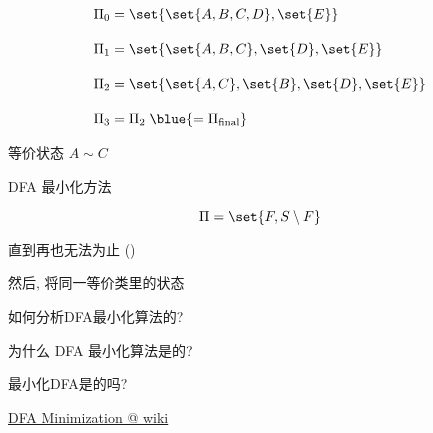\begin{frame}{}
  \begin{align*}
    \Pi_{0} &= \set{\set{A, B, C, D}, \set{E}} \\[10pt]
    \Pi_{1} &= \set{\set{A, B, C}, \set{D}, \set{E}} \\[10pt]
    \Pi_{2} &= \set{\set{A, C}, \set{B}, \set{D}, \set{E}} \\[10pt]
    \Pi_{3} &= \Pi_{2} \;\blue{= \Pi_{\text{final}}}
  \end{align*}
\end{frame}

\begin{frame}{}

  \begin{center}
    等价状态 $A \sim C$
  \end{center}


  \pause
  \begin{center}
     
  \end{center}
\end{frame}

\begin{frame}{}
  \begin{center}
    DFA 最小化方法
  \end{center}

  \[
    \Pi = \set{F, S \setminus F}
  \]


  \begin{center}
    直到再也无法为止 \quad ()

    \vspace{0.40cm}
    然后, 将同一等价类里的状态
  \end{center}
\end{frame}

\begin{frame}{}
  \begin{center}
    如何分析DFA最小化算法的?

    \pause
    \vspace{0.60cm}
    为什么 DFA 最小化算法是的?

    \pause
    \vspace{0.60cm}
    最小化DFA是的吗?

    \pause
    \vspace{0.80cm}
	\href{https://en.wikipedia.org/wiki/DFA_minimization}{DFA Minimization @ wiki}
  \end{center}
\end{frame}

